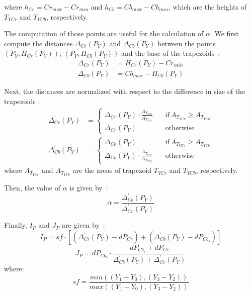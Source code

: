 \noindent where $h_{Cr} = Cr_{max} - Cr_{min}$ and $h_{Cb} = Cb_{max} - Cb_{min}$, which are the heights of $T_{YCr}$ and $T_{YCb}$, respectively.

The computation of those points are useful for the calculation of $\alpha$. We first compute the distances $\Delta_{Cr}(P_Y)$ and $\Delta_{Cb}(P_Y)$ between the points $(P_Y, H_{Cr}(P_Y))$, $(P_Y, H_{Cb}(P_Y))$ and the base of the trapezoids~\citep{brancati:17}:
\begin{align}
    \Delta_{Cr}(P_Y) &= H_{Cr}(P_Y) - Cr_{min} \\
    \Delta_{Cb}(P_Y) &= Cb_{max} - H_{Cb}(P_Y)
\end{align}

Next, the distances are normalized with respect to the difference in size of the trapezoids \citep{brancati:17}:
\begin{align}
  \Delta^{'}_{Cr}(P_Y) &=  \begin{cases}
                \Delta_{Cr}(P_Y) \cdot \frac{A_{T_{YCb}}} {A_{T_{YCr}}} &\quad \text{if}\ A_{T_{YCr}} \geq A_{T_{YCb}} \\
                \Delta_{Cr}(P_Y) &\quad \text{otherwise}
              \end{cases}
\\
  \Delta^{'}_{Cb}(P_Y) &=  \begin{cases}
                \Delta_{Cb}(P_Y) &\quad \text{if}\ A_{T_{YCr}} \geq A_{T_{YCb}} \\
                \Delta_{Cb}(P_Y) \cdot \frac{A_{T_{YCr}}} {A_{T_{YCb}}} &\quad \text{otherwise}
              \end{cases}
\end{align}
where $A_{T_{YCr}}$ and $A_{T_{YCb}}$ are the areas of trapezoid ${T_{YCr}}$ and ${T_{YCb}}$, respectively.

Then, the value of $\alpha$ is given by~\citep{brancati:17}:
\begin{equation}
    \alpha = \frac{\Delta^{'}_{Cb}(P_Y)} {\Delta^{'}_{Cr}(P_Y)}
\end{equation}

Finally, $I_P$ and $J_P$ are given by~\citep{brancati:17}:
\begin{equation}
    I_P = sf \cdot [(\Delta^{'}_{Cr}(P_Y) - dP_{Cr}) + (\Delta^{'}_{Cb}(P_Y) - dP_{Cb_s})]
    \label{eq:ip}
\end{equation}
\begin{equation}
    J_P = dP_{Cb_s} \cdot \frac{dP_{Cb_s} + dP_{Cr}} {\Delta^{'}_{Cb}(P_Y) + \Delta^{'}_{Cr}(P_Y)}
    \label{eq:jp}
\end{equation}
where:
\begin{equation}
    sf = \frac{min( (Y_1 - Y_0), (Y_3 - Y_2) )} {max( (Y_1 - Y_0), (Y_3 - Y_2) )}
\end{equation}

